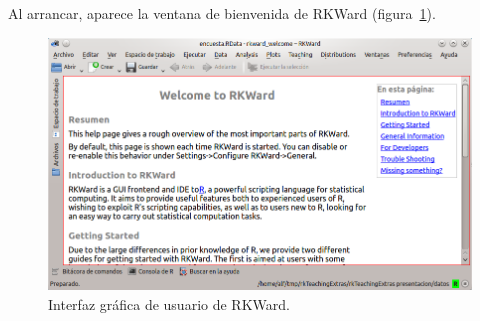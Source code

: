 Al arrancar, aparece la ventana de bienvenida de RKWard (figura~\ref{g:rkward}).
\begin{figure}[htp]
\begin{center}
  \includegraphics[scale=0.5]{introduccion_r/img/rkward}
  \caption{Interfaz gráfica de usuario de RKWard.}
  \label{g:rkward}
\end{center}
\end{figure}

